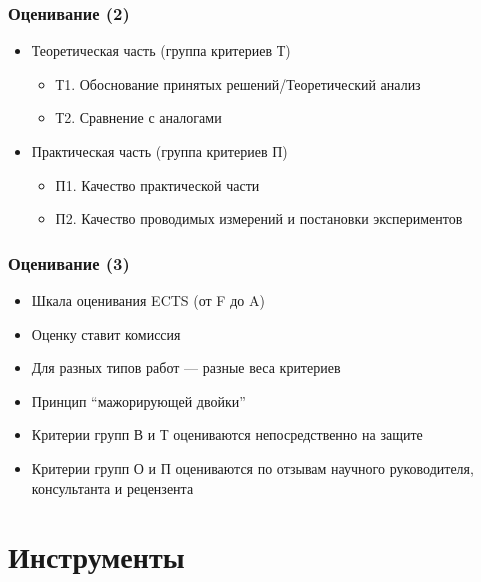 \documentclass[xetex,mathserif,serif]{beamer}
\begin{document}
    \begin{frame}
        \frametitle{Оценивание (2)}
        \begin{itemize}
            \item Теоретическая часть (группа критериев Т)
            \begin{itemize}
                \item Т1. Обоснование принятых решений/Теоретический анализ
                \item Т2. Сравнение с аналогами
            \end{itemize}
            \item Практическая часть (группа критериев П)
            \begin{itemize}
                \item П1. Качество практической части
                \item П2. Качество проводимых измерений и постановки экспериментов
            \end{itemize}
        \end{itemize}
    \end{frame}

    \begin{frame}
        \frametitle{Оценивание (3)}
        \begin{itemize}
            \item Шкала оценивания ECTS (от F до A)
            \item Оценку ставит комиссия
            \item Для разных типов работ --- разные веса критериев
            \item Принцип ``мажорирующей двойки''
            \item Критерии групп В и Т оцениваются непосредственно на защите
            \item Критерии групп О и П оцениваются по отзывам научного руководителя, консультанта и рецензента
        \end{itemize}
    \end{frame}

    \section{Инструменты}
\end{document}
